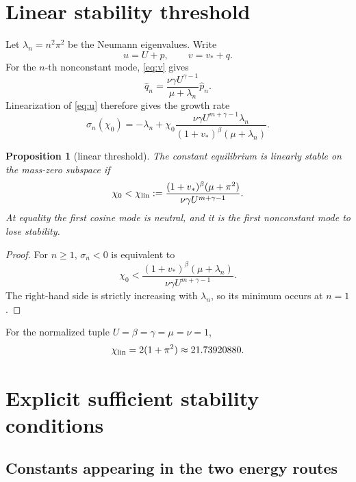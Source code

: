 \documentclass[11pt]{article}
\newtheorem{proposition}{Proposition}
\begin{document}
\section{Linear stability threshold}

Let \(\lambda_n=n^2\pi^2\) be the Neumann eigenvalues.  Write
\[
 u=U+p,\qquad v=v_*+q.
\]
For the \(n\)-th nonconstant mode, \eqref{eq:v} gives
\[
 \widehat q_n
 =\frac{\nu\gamma U^{\gamma-1}}{\mu+\lambda_n}
   \widehat p_n.
\]
Linearization of \eqref{eq:u} therefore gives the growth rate
\begin{equation}
 \sigma_n(\chi_0)
 =-\lambda_n+
 \chi_0\frac{\nu\gamma U^{m+\gamma-1}\lambda_n}
 {(1+v_*)^\beta(\mu+\lambda_n)}.                       \label{eq:sigma}
\end{equation}

\begin{proposition}[linear threshold]
The constant equilibrium is linearly stable on the mass-zero subspace if
\begin{equation}
 \chi_0<\chi_{\rm lin}:=
 \frac{(1+v_*)^\beta(\mu+\pi^2)}
 {\nu\gamma U^{m+\gamma-1}}.                           \label{eq:chilin}
\end{equation}
At equality the first cosine mode is neutral, and it is the first
nonconstant mode to lose stability.
\end{proposition}

\begin{proof}
For \(n\ge1\), \(\sigma_n<0\) is equivalent to
\[
 \chi_0<
 \frac{(1+v_*)^\beta(\mu+\lambda_n)}
 {\nu\gamma U^{m+\gamma-1}}.
\]
The right-hand side is strictly increasing with \(\lambda_n\), so its
minimum occurs at \(n=1\).
\end{proof}

For the normalized tuple \(U=\beta=\gamma=\mu=\nu=1\),
\begin{equation}
 \chi_{\rm lin}=2(1+\pi^2)\approx21.73920880.           \label{eq:fixedlin}
\end{equation}

\section{Explicit sufficient stability conditions}

\subsection{Constants appearing in the two energy routes}
\end{document}
